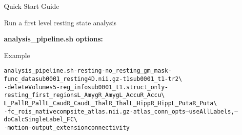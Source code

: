 \documentclass[]{report}
\begin{document}
\begin{chapter}{Quick Start Guide }
\begin{section}{Run a first level resting state analysis}
\begin{subsubsection}{\bf analysis\_pipeline.sh options: }
\begin{description}
\end{description}
\end{subsubsection}


\begin{subsubsection}{Example}
\begin{alltt}
analysis\_pipeline.sh -resting -no_resting_gm_mask -func\_data sub0001\_resting4D.nii.gz -t1 sub0001_t1  -tr 2  \textbackslash  \\
\hspace*{0.5in} -deleteVolumes 5 -reg_info sub0001\_t1.struct_only -resting_first_regions L\_Amyg R\_Amyg L\_Accu R\_Accu \textbackslash  \\
\hspace*{0.5in} L\_Pall   R\_Pall L\_Caud R\_Caud L\_Thal R\_Thal L\_Hipp R\_Hipp L\_Puta R\_Puta   \textbackslash  \\
\hspace*{0.5in} -fc\_rois\_native compsite_atlas.nii.gz -atlas_conn_opts --useAllLabels,--doCalcSingleLabel\_FC   \textbackslash  \\
\hspace*{0.5in} -motion -output_extension connectivity
\end{alltt}
\end{subsubsection}

\end{section}


\end{chapter}
\end{document}
